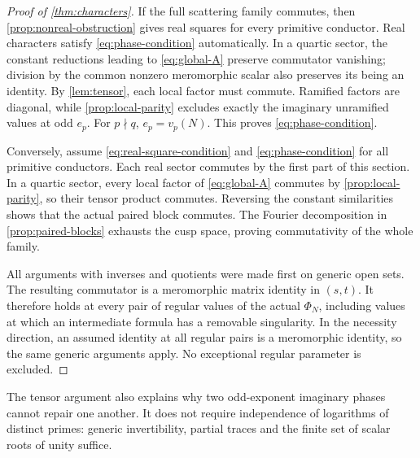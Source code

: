 \begin{proof}[Proof of \cref{thm:characters}]
If the full scattering family commutes, then
\cref{prop:nonreal-obstruction} gives real squares for every
primitive conductor. Real characters satisfy
\eqref{eq:phase-condition} automatically. In a quartic sector,
the constant reductions leading to \eqref{eq:global-A} preserve
commutator vanishing; division by the common nonzero meromorphic
scalar also preserves its being an identity. By \cref{lem:tensor},
each local factor must commute. Ramified factors are diagonal,
while \cref{prop:local-parity} excludes exactly the imaginary
unramified values at odd \(e_p\). For \(p\nmid q\),
\(e_p=v_p(N)\). This proves \eqref{eq:phase-condition}.

Conversely, assume \eqref{eq:real-square-condition} and
\eqref{eq:phase-condition} for all primitive conductors.
Each real sector commutes by the first part of this section.
In a quartic sector, every local factor of
\eqref{eq:global-A} commutes by \cref{prop:local-parity}, so
their tensor product commutes. Reversing the constant similarities
shows that the actual paired block commutes. The Fourier
decomposition in \cref{prop:paired-blocks} exhausts the cusp
space, proving commutativity of the whole family.

All arguments with inverses and quotients were made first on
generic open sets. The resulting commutator is a meromorphic
matrix identity in \((s,t)\). It therefore holds at every pair
of regular values of the actual \(\Phi_N\), including values at
which an intermediate formula has a removable singularity.
In the necessity direction, an assumed identity at all regular
pairs is a meromorphic identity, so the same generic arguments
apply. No exceptional regular parameter is excluded.
\end{proof}

The tensor argument also explains why two odd-exponent imaginary
phases cannot repair one another. It does not require independence
of logarithms of distinct primes: generic invertibility, partial
traces and the finite set of scalar roots of unity suffice.
